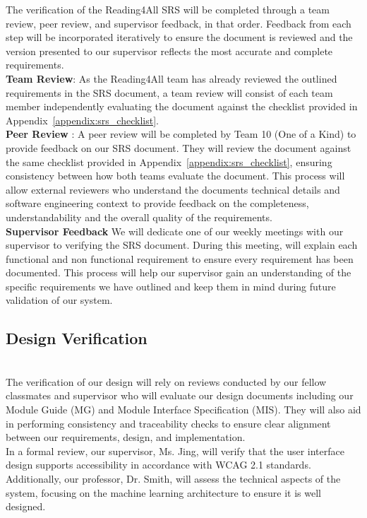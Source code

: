 \documentclass[12pt, titlepage]{article}
\begin{document}
The verification of the Reading4All SRS will be completed
 through a team review, peer review, and supervisor feedback, in that order. 
 Feedback from each step will be incorporated iteratively to ensure the document is reviewed and the version presented to our supervisor reflects the most accurate and complete requirements. \\

\textbf{Team Review}:
As the Reading4All team has already reviewed the outlined requirements in the SRS document, a team review will 
consist of each team member independently evaluating the document against the checklist provided in Appendix~\ref{appendix:srs_checklist}.   \\

\textbf{Peer Review }:
A peer review will be completed by Team 10 (One of a Kind) to provide feedback on our SRS document.
They will review the document against the same checklist provided in Appendix~\ref{appendix:srs_checklist}, ensuring consistency between how both teams evaluate the document. 
This process will allow external reviewers who understand the documents technical details and software engineering context to provide feedback on the completeness, understandability and the overall quality of the requirements. \\

\textbf{Supervisor Feedback}
We will dedicate one of our weekly meetings with our supervisor to verifying the SRS document. 
During this meeting, will explain each functional and non functional requirement to ensure every requirement has been documented.
This process will help our supervisor gain an understanding of the specific requirements we have outlined and keep them in 
mind during future validation of our system. \\


\subsection{Design Verification}



\\
The verification of our design will rely on reviews conducted by our fellow classmates and supervisor who will
evaluate our design documents including our Module Guide (MG) and Module Interface Specification (MIS). They will also aid in performing
consistency and traceability checks to ensure clear alignment between our requirements, design, and implementation. \\[1ex]
In a formal review, our supervisor, Ms. Jing, will verify that the user interface design supports accessibility in accordance with WCAG 2.1 standards. 
Additionally, our professor, Dr. Smith, will assess the technical aspects of the system, focusing on the machine learning architecture to ensure it is well designed.
\end{document}
